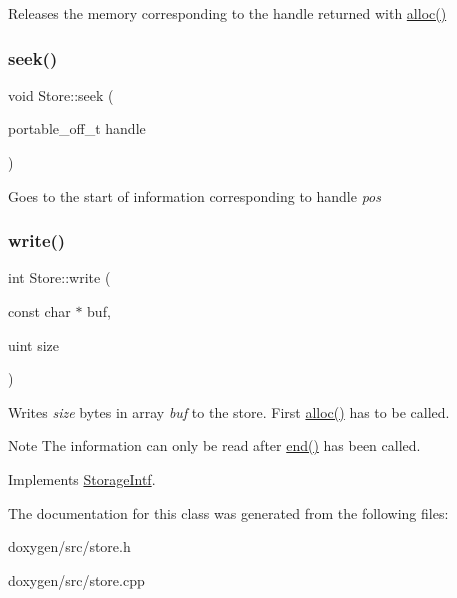 Releases the memory corresponding to the handle returned with \mbox{\hyperlink{class_store_ac1ce3fb86b3bc46125756b9ef782c095}{alloc()}} \mbox{\label{class_store_ad77053023f371abfc70f76ee2a14c377}} 
\subsubsection{\texorpdfstring{seek()}{seek()}}
{\footnotesize\ttfamily void Store\+::seek (\begin{DoxyParamCaption}\item[{portable\+\_\+off\+\_\+t}]{handle }\end{DoxyParamCaption})}

Goes to the start of information corresponding to handle {\itshape pos} \mbox{\label{class_store_aec754c74cf190cb55281a923db21194a}} 
\subsubsection{\texorpdfstring{write()}{write()}}
{\footnotesize\ttfamily int Store\+::write (\begin{DoxyParamCaption}\item[{const char $\ast$}]{buf,  }\item[{uint}]{size }\end{DoxyParamCaption})\hspace{0.3cm}{\ttfamily [virtual]}}

Writes {\itshape size} bytes in array {\itshape buf} to the store. First \mbox{\hyperlink{class_store_ac1ce3fb86b3bc46125756b9ef782c095}{alloc()}} has to be called. \begin{DoxyNote}{Note}
The information can only be read after \mbox{\hyperlink{class_store_a616a1f53fa04d39d505a03b1f49ab7a6}{end()}} has been called. 
\end{DoxyNote}


Implements \mbox{\hyperlink{class_storage_intf_a97b26023c6cf0590423e428947d6febb}{Storage\+Intf}}.



The documentation for this class was generated from the following files\+:\begin{DoxyCompactItemize}
\item 
doxygen/src/store.\+h\item 
doxygen/src/store.\+cpp\end{DoxyCompactItemize}
